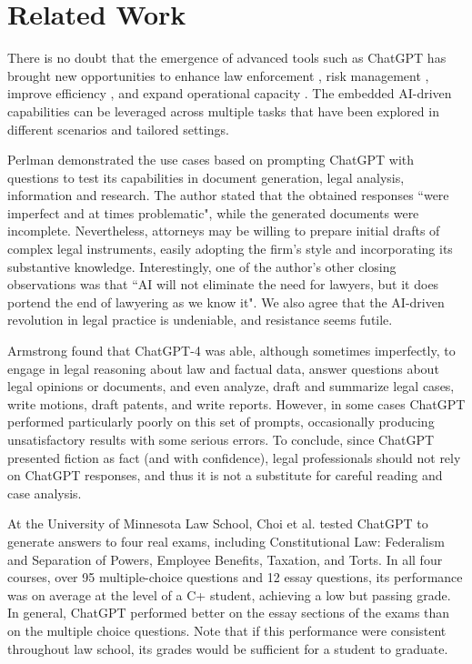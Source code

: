 \section{Related Work}
\label{sec:related-work}
There is no doubt that the emergence of advanced tools such as ChatGPT has brought new opportunities to enhance law enforcement \cite{pandey2024exploring}, risk management \cite{halford2024using}, improve efficiency \cite{raj2023analyzing}, and expand operational capacity \cite{chen2024antecedents}. The embedded AI-driven capabilities can be leveraged across multiple tasks that have been explored in different scenarios and tailored settings.

Perlman \cite{perlman2023implications} demonstrated the use cases based on prompting ChatGPT with questions to test its capabilities in document generation, legal analysis, information and research. The author stated that the obtained responses ``were imperfect and at times problematic", while the generated documents were incomplete. Nevertheless, attorneys may be willing to prepare initial drafts of complex legal instruments, easily adopting the firm's style and incorporating its substantive knowledge. Interestingly, one of the author's other closing observations was that ``AI will not eliminate the need for lawyers, but it does portend the end of lawyering as we know it". We also agree that the AI-driven revolution in legal practice is undeniable, and resistance seems futile.

Armstrong \cite{armstrong2023s} found that ChatGPT-4 was able, although sometimes imperfectly, to engage in legal reasoning about law and factual data, answer questions about legal opinions or documents, and even analyze, draft and summarize legal cases, write motions, draft patents, and write reports. However, in some cases ChatGPT performed particularly poorly on this set of prompts, occasionally producing unsatisfactory results with some serious errors. To conclude, since ChatGPT presented fiction as fact (and with confidence), legal professionals should not rely on ChatGPT responses, and thus it is not a substitute for careful reading and case analysis. 

At the University of Minnesota Law School, Choi et al. \cite{choi2021chatgpt} tested ChatGPT to generate answers to four real exams, including Constitutional Law: Federalism and Separation of Powers, Employee Benefits, Taxation, and Torts. In all four courses, over 95 multiple-choice questions and 12 essay questions, its performance was on average at the level of a C+ student, achieving a low but passing grade. In general, ChatGPT performed better on the essay sections of the exams than on the multiple choice questions. Note that if this performance were consistent throughout law school, its grades would be sufficient for a student to graduate.

